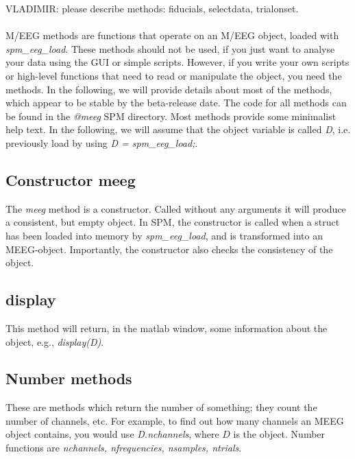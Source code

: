 VLADIMIR: please describe methods: fiducials, selectdata, trialonset.
\\
\\
M/EEG methods are functions that operate on an M/EEG object, loaded
with \textit{spm\_eeg\_load}. These methods should not be used, if you just
want to analyse your data using the GUI or simple scripts. However, if
you write your own scripts or high-level functions that need to read
or manipulate the object, you need the methods. In the following, we
will provide details about most of the methods, which appear to be
stable by the beta-release date. The code for all methods
can be found in the \textit{@meeg} SPM directory. Most methods provide
some minimalist help text. In the following, we will assume that the
object variable is called \textit{D}, i.e. previously load by using \textit{D
  = spm\_eeg\_load;}.

\subsection{Constructor meeg}
The \textit{meeg} method is a constructor. Called without any arguments it
will produce a consistent, but empty object. In SPM, the constructor
is called when a struct has been loaded into memory by
\textit{spm\_eeg\_load}, and is transformed into an
MEEG-object. Importantly, the constructor also checks the consistency
of the object. 

\subsection{display}
This method will return, in the matlab window, some information about
the object, e.g., \textit{display(D)}. 

\subsection{Number methods}
These are methods which return the number of something; they count the
number of channels, etc. For example, to find out how many channels an
MEEG object contains, you would use \textit{D.nchannels}, where $D$ is the
object. Number functions are \textit{nchannels, nfrequencies, nsamples,
  ntrials}.



